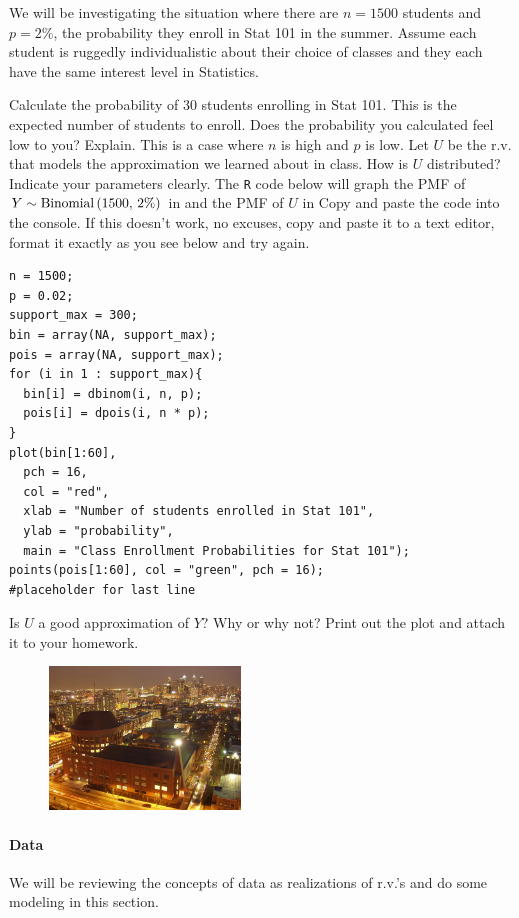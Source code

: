 \documentclass[12pt]{article}
\begin{document}
\problem We will be investigating the situation where there are $n=1500$ students and $p=2\%$, the probability they enroll in Stat 101 in the summer. Assume each student is ruggedly individualistic about their choice of classes and they each have the same interest level in Statistics.

\begin{enumerate}
\easysubproblem Calculate the probability of 30 students enrolling in Stat 101. This is the expected number of students to enroll. Does the probability you calculated feel low to you? Explain.
\easysubproblem This is a case where $n$ is high and $p$ is low. Let $U$ be the r.v. that models the approximation we learned about in class. How is $U$ distributed? Indicate your parameters clearly.
\easysubproblem The \texttt{R} code below will graph the PMF of $Y \sim \mathrm{Binomial}\left(1500,\,2\%\right)$ in  and the PMF of $U$ in  Copy and paste the code into the console. If this doesn't work, no excuses, copy and paste it to a text editor, format it exactly as you see below and try again.

\begin{verbatim}
n = 1500; 
p = 0.02; 
support_max = 300; 
bin = array(NA, support_max); 
pois = array(NA, support_max); 
for (i in 1 : support_max){
  bin[i] = dbinom(i, n, p); 
  pois[i] = dpois(i, n * p); 
}
plot(bin[1:60],
  pch = 16, 
  col = "red", 
  xlab = "Number of students enrolled in Stat 101", 
  ylab = "probability", 
  main = "Class Enrollment Probabilities for Stat 101"); 
points(pois[1:60], col = "green", pch = 16);
#placeholder for last line
\end{verbatim}

Is $U$ a good approximation of $Y$? Why or why not? Print out the plot and attach it to your homework.
\end{enumerate}


\begin{figure}[htp]
\centering
\includegraphics[width=2in, height=1.5in]{huntsman.jpg}
\end{figure}
\FloatBarrier

\paragraph{Data} We will be reviewing the concepts of data as realizations of r.v.'s and do some modeling in this section. \\
\end{document}
